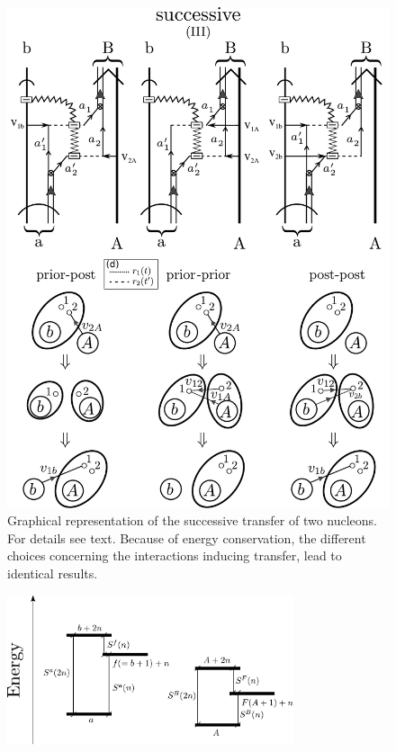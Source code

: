 \begin{subappendices}
\begin{figure}[h!]
\begin{center}
\includegraphics*[width=\textwidth]{C7/figs_C7/Reaction2}
\end{center}
	\caption{Graphical representation of  the successive transfer of two nucleons. For details see text. Because of energy conservation, the different choices concerning the interactions inducing transfer, lead to identical results.}
\label{figC7C2}
\end{figure}
 \begin{figure}
 	\begin{center}
\includegraphics*[width=0.75\textwidth]{C7/figs_C7/figC7C3}

\end{center}
\end{figure}
\end{subappendices}
